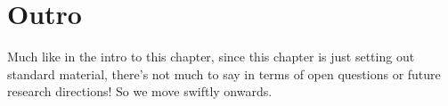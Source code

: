 \section{Outro}

Much like in the intro to this chapter, since this chapter is just setting out standard material, there's not much to say in terms of open questions or future research directions!
So we move swiftly onwards.